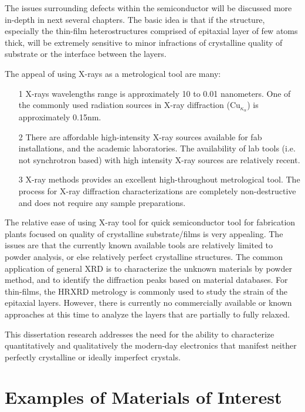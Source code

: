 The issues surrounding defects within the semiconductor will be discussed more in-depth in next several chapters.   The basic idea is that if the structure, especially the thin-film heterostructures comprised of epitaxial layer of few atoms thick, will be extremely sensitive to minor infractions of crystalline quality of substrate or the interface between the layers.


The appeal of using X-rays as a metrological tool are many:

{\SingleSpacing
\begin{itemize}
\item[1]  X-rays wavelengths range is approximately 10 to 0.01 nanometers.  One of the commonly used radiation sources in X-ray diffraction (Cu$_{\kappa_\alpha}$) is approximately 0.15nm.
\item[2]  There are affordable high-intensity X-ray sources available for fab installations, and the academic laboratories.  The availability of lab tools (i.e. not synchrotron based) with high intensity X-ray sources are relatively recent.
\item[3] X-ray methods provides an excellent high-throughout metrological tool. The process for X-ray diffraction characterizations are completely non-destructive and does not require any sample preparations.
\end{itemize}
}
The relative ease of using X-ray tool for quick semiconductor tool for fabrication plants focused on quality of crystalline substrate/films is very appealing.  The issues are that the currently known available tools are relatively limited to powder analysis, or else relatively perfect crystalline structures.  The common application of general XRD is to characterize the unknown materials by powder method, and to identify the diffraction peaks based on material databases.  For thin-films, the HRXRD metrology is commonly used to study the strain of the epitaxial layers.  However, there is currently no commercially available or known approaches at this time to analyze the layers that are partially to fully relaxed.

This dissertation research addresses the need for the ability to characterize quantitatively and qualitatively the modern-day electronics that manifest neither perfectly crystalline or ideally imperfect crystals.





\chapter{Examples of Materials of Interest}

